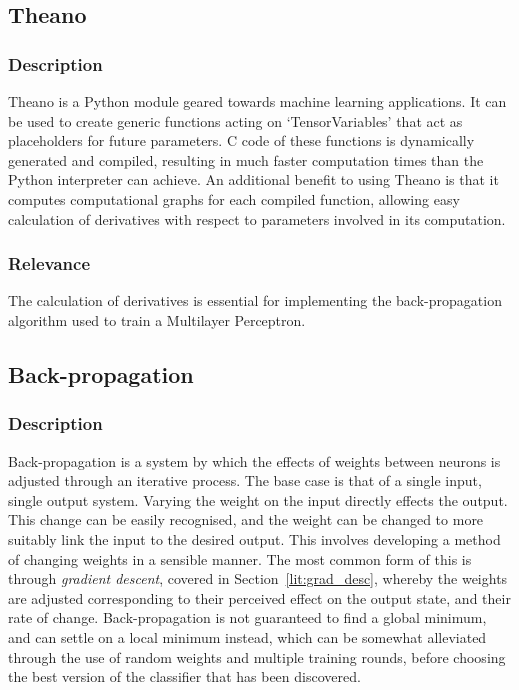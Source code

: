 \subsection{Theano}\label{lit:theano}
\subsubsection{Description}
Theano is a Python module geared towards machine learning applications. It can be used to create generic functions acting on `TensorVariables' that act as placeholders for future parameters. C code of these functions is dynamically generated and compiled, resulting in much faster computation times than the Python interpreter can achieve. An additional benefit to using Theano is that it computes computational graphs for each compiled function, allowing easy calculation of derivatives with respect to parameters involved in its computation.

\subsubsection{Relevance}
The calculation of derivatives is essential for implementing the back-propagation algorithm used to train a Multilayer Perceptron.

\subsection{Back-propagation}\label{lit:back_prop}
\subsubsection{Description}
Back-propagation is a system by which the effects of weights between neurons is adjusted through an iterative process. The base case is that of a single input, single output system. 
Varying the weight on the input directly effects the output. This change can be easily recognised, and the weight can be changed to more suitably link the input to the desired output. This involves developing a method of changing weights in a sensible manner. The most common form of this is through \textit{gradient descent}, covered in Section~\ref{lit:grad_desc}, whereby the weights are adjusted corresponding to their perceived effect on the output state, and their rate of change. Back-propagation is not guaranteed to find a global minimum, and can settle on a local minimum instead, which can be somewhat alleviated through the use of random weights and multiple training rounds, before choosing the best version of the classifier that has been discovered. 


